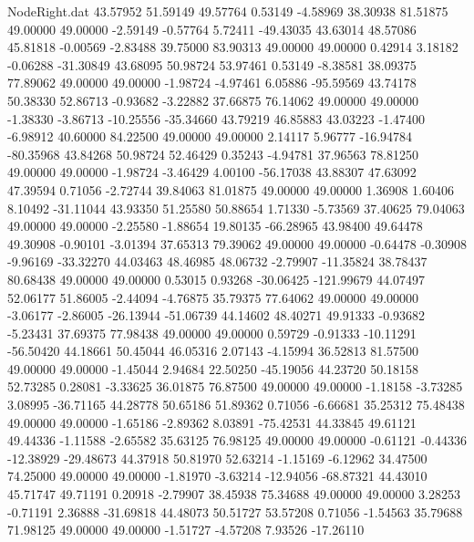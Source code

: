 \begin{filecontents}{NodeRight.dat}
  43.57952   51.59149   49.57764     0.53149   -4.58969   38.30938   81.51875   49.00000   49.00000   -2.59149   -0.57764    5.72411  -49.43035
  43.63014   48.57086   45.81818    -0.00569   -2.83488   39.75000   83.90313   49.00000   49.00000    0.42914    3.18182   -0.06288  -31.30849
  43.68095   50.98724   53.97461     0.53149   -8.38581   38.09375   77.89062   49.00000   49.00000   -1.98724   -4.97461    6.05886  -95.59569
  43.74178   50.38330   52.86713    -0.93682   -3.22882   37.66875   76.14062   49.00000   49.00000   -1.38330   -3.86713  -10.25556  -35.34660
  43.79219   46.85883   43.03223    -1.47400   -6.98912   40.60000   84.22500   49.00000   49.00000    2.14117    5.96777  -16.94784  -80.35968
  43.84268   50.98724   52.46429     0.35243   -4.94781   37.96563   78.81250   49.00000   49.00000   -1.98724   -3.46429    4.00100  -56.17038
  43.88307   47.63092   47.39594     0.71056   -2.72744   39.84063   81.01875   49.00000   49.00000    1.36908    1.60406    8.10492  -31.11044
  43.93350   51.25580   50.88654     1.71330   -5.73569   37.40625   79.04063   49.00000   49.00000   -2.25580   -1.88654   19.80135  -66.28965
  43.98400   49.64478   49.30908    -0.90101   -3.01394   37.65313   79.39062   49.00000   49.00000   -0.64478   -0.30908   -9.96169  -33.32270
  44.03463   48.46985   48.06732    -2.79907  -11.35824   38.78437   80.68438   49.00000   49.00000    0.53015    0.93268  -30.06425 -121.99679
  44.07497   52.06177   51.86005    -2.44094   -4.76875   35.79375   77.64062   49.00000   49.00000   -3.06177   -2.86005  -26.13944  -51.06739
  44.14602   48.40271   49.91333    -0.93682   -5.23431   37.69375   77.98438   49.00000   49.00000    0.59729   -0.91333  -10.11291  -56.50420
  44.18661   50.45044   46.05316     2.07143   -4.15994   36.52813   81.57500   49.00000   49.00000   -1.45044    2.94684   22.50250  -45.19056
  44.23720   50.18158   52.73285     0.28081   -3.33625   36.01875   76.87500   49.00000   49.00000   -1.18158   -3.73285    3.08995  -36.71165
  44.28778   50.65186   51.89362     0.71056   -6.66681   35.25312   75.48438   49.00000   49.00000   -1.65186   -2.89362    8.03891  -75.42531
  44.33845   49.61121   49.44336    -1.11588   -2.65582   35.63125   76.98125   49.00000   49.00000   -0.61121   -0.44336  -12.38929  -29.48673
  44.37918   50.81970   52.63214    -1.15169   -6.12962   34.47500   74.25000   49.00000   49.00000   -1.81970   -3.63214  -12.94056  -68.87321
  44.43010   45.71747   49.71191     0.20918   -2.79907   38.45938   75.34688   49.00000   49.00000    3.28253   -0.71191    2.36888  -31.69818
  44.48073   50.51727   53.57208     0.71056   -1.54563   35.79688   71.98125   49.00000   49.00000   -1.51727   -4.57208    7.93526  -17.26110

\end{filecontents}
